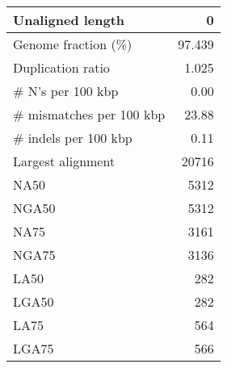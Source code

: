 \documentclass[12pt,a4paper]{article}
\begin{document}
\begin{table}[ht]
\begin{center}
\begin{tabular}{|l*{1}{|r}|}
Unaligned length & 0 \\ \hline
Genome fraction (\%) & 97.439 \\ \hline
Duplication ratio & 1.025 \\ \hline
\# N's per 100 kbp & 0.00 \\ \hline
\# mismatches per 100 kbp & 23.88 \\ \hline
\# indels per 100 kbp & 0.11 \\ \hline
Largest alignment & 20716 \\ \hline
NA50 & 5312 \\ \hline
NGA50 & 5312 \\ \hline
NA75 & 3161 \\ \hline
NGA75 & 3136 \\ \hline
LA50 & 282 \\ \hline
LGA50 & 282 \\ \hline
LA75 & 564 \\ \hline
LGA75 & 566 \\ \hline
\end{tabular}
\end{center}
\end{table}
\end{document}

